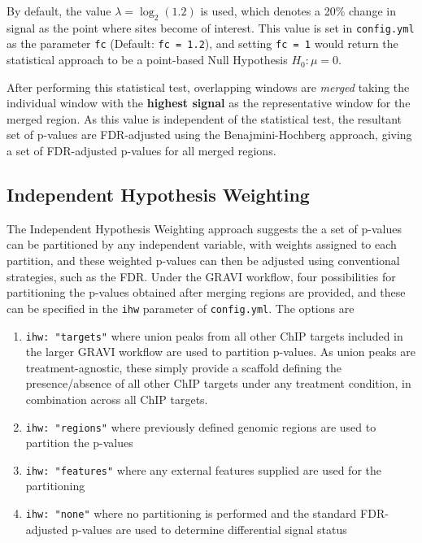 \documentclass[
]{book}
\providecommand{\tightlist}{%
  \setlength{\itemsep}{0pt}\setlength{\parskip}{0pt}}
\begin{document}
By default, the value \(\lambda = \log_2(1.2)\) is used, which denotes a 20\% change in signal as the point where sites become of interest.
This value is set in \texttt{config.yml} as the parameter \texttt{fc} (Default: \texttt{fc\ =\ 1.2}), and setting \texttt{fc\ =\ 1} would return the statistical approach to be a point-based Null Hypothesis \(H_0: \mu = 0\).

After performing this statistical test, overlapping windows are \emph{merged} taking the individual window with the \textbf{highest signal} as the representative window for the merged region.
As this value is independent of the statistical test\citep{csaw}, the resultant set of p-values are FDR-adjusted using the Benajmini-Hochberg approach\citep{fdr}, giving a set of FDR-adjusted p-values for all merged regions.

\hypertarget{independent-hypothesis-weighting}{%
\subsection*{Independent Hypothesis Weighting}\label{independent-hypothesis-weighting}}

The Independent Hypothesis Weighting approach\citep{ihw} suggests the a set of p-values can be partitioned by any independent variable, with weights assigned to each partition, and these weighted p-values can then be adjusted using conventional strategies, such as the FDR.
Under the GRAVI workflow, four possibilities for partitioning the p-values obtained after merging regions are provided, and these can be specified in the \texttt{ihw} parameter of \texttt{config.yml}.
The options are

\begin{enumerate}
\def\labelenumi{\arabic{enumi}.}
\tightlist
\item
  \texttt{ihw:\ "targets"} where union peaks from all other ChIP targets included in the larger GRAVI workflow are used to partition p-values. As union peaks are treatment-agnostic, these simply provide a scaffold defining the presence/absence of all other ChIP targets under any treatment condition, in combination across all ChIP targets.
\item
  \texttt{ihw:\ "regions"} where previously defined genomic regions are used to partition the p-values
\item
  \texttt{ihw:\ "features"} where any external features supplied are used for the partitioning
\item
  \texttt{ihw:\ "none"} where no partitioning is performed and the standard FDR-adjusted p-values are used to determine differential signal status
\end{enumerate}
\end{document}
